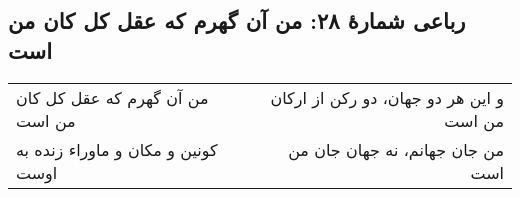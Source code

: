 \begin{center}
\section*{رباعی شمارهٔ ۲۸: من آن گهرم که عقل کل کان من است}
\label{sec:028}
\begin{longtable}{l p{0.5cm} r}
من آن گهرم که عقل کل کان من است
&&
و این هر دو جهان، دو رکن از ارکان من است
\\
کونین و مکان و ماوراء زنده به اوست
&&
من جان جهانم، نه جهان جان من است
\\
\end{longtable}
\end{center}
